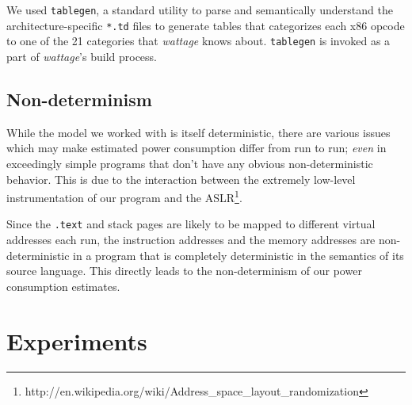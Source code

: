 We used \texttt{tablegen}, a standard utility to parse and
semantically understand the architecture-specific \texttt{*.td} files
to generate tables that categorizes each x86 opcode to one of the 21
categories that \textit{wattage} knows about.  \texttt{tablegen} is
invoked as a part of \textit{wattage}'s build process.

\subsection{Non-determinism}

While the model we worked with is itself deterministic, there are
various issues which may make estimated power consumption differ from
run to run; \textit{even} in exceedingly simple programs that don't
have any obvious non-deterministic behavior.  This is due to the
interaction between the extremely low-level instrumentation of our
program and the
ASLR\footnote{http://en.wikipedia.org/wiki/Address\_space\_layout\_randomization}.

Since the \texttt{.text} and stack pages are likely to be mapped to
different virtual addresses each run, the instruction addresses and
the memory addresses are non-deterministic in a program that is
completely deterministic in the semantics of its source language.
This directly leads to the non-determinism of our power consumption
estimates.

\section{Experiments}


